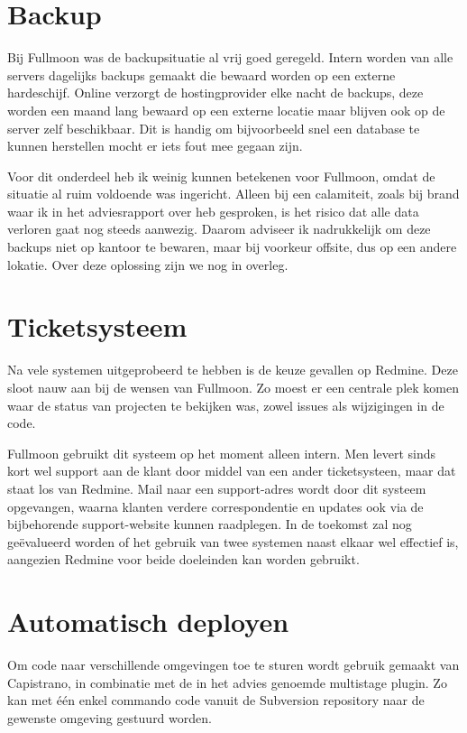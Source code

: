 \section{Backup}

Bij Fullmoon was de backupsituatie al vrij goed geregeld. Intern worden van alle servers dagelijks backups gemaakt die bewaard worden op een externe hardeschijf. Online verzorgt de hostingprovider elke nacht de backups, deze worden een maand lang bewaard op een externe locatie maar blijven ook op de server zelf beschikbaar. Dit is handig om bijvoorbeeld snel een database te kunnen herstellen mocht er iets fout mee gegaan zijn.

Voor dit onderdeel heb ik weinig kunnen betekenen voor Fullmoon, omdat de situatie al ruim voldoende was ingericht. Alleen bij een calamiteit, zoals bij brand waar ik in het adviesrapport over heb gesproken, is het risico dat alle data verloren gaat nog steeds aanwezig. Daarom adviseer ik nadrukkelijk om deze backups niet op kantoor te bewaren, maar bij voorkeur offsite, dus op een andere lokatie. Over deze oplossing zijn we nog in overleg.

\section{Ticketsysteem}

Na vele systemen uitgeprobeerd te hebben is de keuze gevallen op Redmine. Deze sloot nauw aan bij de wensen van Fullmoon. Zo moest er een centrale plek komen waar de status van projecten te bekijken was, zowel issues als wijzigingen in de code.

Fullmoon gebruikt dit systeem op het moment alleen intern. Men levert sinds kort wel support aan de klant door middel van een ander ticketsysteen, maar dat staat los van Redmine. Mail naar een support-adres wordt door dit systeem opgevangen, waarna klanten verdere correspondentie en updates ook via de bijbehorende support-website kunnen raadplegen. In de toekomst zal nog geëvalueerd worden of het gebruik van twee systemen naast elkaar wel effectief is, aangezien Redmine voor beide doeleinden kan worden gebruikt.

\section{Automatisch deployen}

Om code naar verschillende omgevingen toe te sturen wordt gebruik gemaakt van Capistrano, in combinatie met de in het advies genoemde multistage plugin. Zo kan met één enkel commando code vanuit de Subversion repository naar de gewenste omgeving gestuurd worden.

